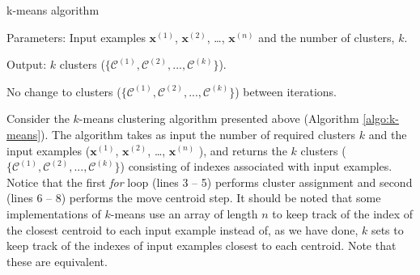 \begin{algorithm}[ht!]
	\caption{k-means algorithm}
    
    Parameters: Input examples {$\mathbf{x}^{(1)}$, $\mathbf{x}^{(2)}$, \dots, $\mathbf{x}^{(n)}$ } and the number of clusters, $k$.
    
    Output: $k$ clusters ($\{\mathcal{C}^{(1)}, \mathcal{C}^{(2)}, ..., \mathcal{C}^{(k)}\}$).
    
	\begin{algorithmic}[1] 
		
        \REPEAT
		\ENDFOR
        \ENDFOR

		\UNTIL No change to clusters ($\{\mathcal{C}^{(1)}, \mathcal{C}^{(2)}, ..., \mathcal{C}^{(k)}\}$) between iterations. 
		
	\end{algorithmic}
	\label{algo:k-means}
\end{algorithm}

Consider the $k$-means clustering algorithm presented above (Algorithm \ref{algo:k-means}). The algorithm takes as input the number of required clusters $k$ and the input examples ({$\mathbf{x}^{(1)}$, $\mathbf{x}^{(2)}$, \dots, $\mathbf{x}^{(n)}$ }), and returns the $k$ clusters ($\{\mathcal{C}^{(1)}, \mathcal{C}^{(2)}, ..., \mathcal{C}^{(k)}\}$) consisting of indexes associated with input examples. Notice that the first \emph{for} loop (lines 3 -- 5) performs cluster assignment and second (lines 6 -- 8) performs the move centroid step. It should be noted that some implementations of $k$-means use an array of length $n$ to keep track of the index of the closest centroid to each input example instead of, as we have done, $k$ sets to keep track of the indexes of input examples closest to each centroid. Note that these are equivalent. 

